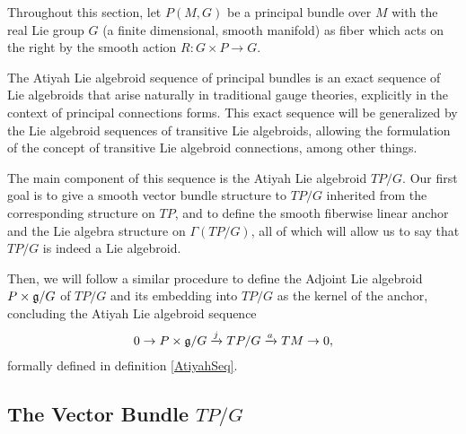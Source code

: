 Throughout this section, let $P(M, G)$ be a principal bundle over $M$ with the real Lie group $G$ (a finite dimensional, smooth manifold) as fiber which acts on the right by the smooth action $R: G \times P \to G$.

The Atiyah Lie algebroid sequence of principal bundles is an exact sequence of Lie algebroids that arise naturally in traditional gauge theories, explicitly in the context of principal connections forms. This exact sequence will be generalized by the Lie algebroid sequences of transitive Lie algebroids, allowing the formulation of the concept of transitive Lie algebroid connections, among other things.

The main component of this sequence is the Atiyah Lie algebroid $TP/G$. Our first goal is to give a smooth vector bundle structure to $TP/G$ inherited from the corresponding structure on $TP$, and to define the smooth fiberwise linear anchor and the Lie algebra structure on $\Gamma(TP/G)$, all of which will allow us to say that $TP/G$ is indeed a Lie algebroid.

Then, we will follow a similar procedure to define the Adjoint Lie algebroid $P \times \mathfrak{g}/G$ of $TP/G$ and its embedding into $TP/G$ as the kernel of the anchor, concluding the Atiyah Lie algebroid sequence
\begin{align*}
    0 \to P \times \mathfrak{g}/G \xrightarrow{j} TP/G \xrightarrow{a} TM \to 0,
\end{align*}
formally defined in definition \ref{AtiyahSeq}.

\subsection{The Vector Bundle $TP/G$}

